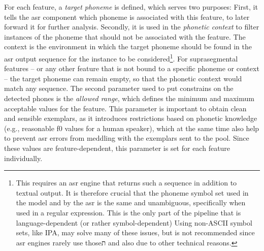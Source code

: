 For each feature, a \emph{target phoneme} is defined, which serves two purposes:
First, it tells the \ac{asr} component which phoneme is associated with this feature, to later forward it for further analysis.
Secondly, it is used in the \emph{phonetic context} to filter instances of the phoneme that should not be associated with the feature.
The context is the environment in which the target phoneme should be found in the \ac{asr} output sequence for the instance to be considered\footnote{This requires an \ac{asr} engine that returns such a sequence in addition to textual output.
It is therefore crucial that the phoneme symbol set used in the model and by the \ac{asr} is the same and unambiguous, specifically when used in a regular expression.
This is the only part of the pipeline that is language-dependent (or rather symbol-dependent)
Using non-ASCII symbol sets, like IPA, may solve many of these issues, but is not recommended since \ac{asr} engines rarely use thoseת and also due to other technical reasons.}.
For suprasegmental features -- or any other feature that is not bound to a specific phoneme or context -- the target phoneme can remain empty, so that the phonetic context would match any sequence.
The second parameter used to put constrains on the detected phones is the \emph{allowed range}, which defines the minimum and maximum acceptable values for the feature.
This parameter is important to obtain clean and sensible exemplars, as it introduces restrictions based on phonetic knowledge (e.g., reasonable \ac{f0} values for a human speaker), which at the same time also help to prevent \ac{asr} errors from meddling with the exemplars sent to the pool.
Since these values are feature-dependent, this parameter is set for each feature individually.
